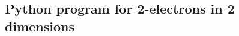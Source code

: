\documentclass[%
oneside,                 %
final,                   %
10pt]{article}
\begin{document}
\subsection*{Python program for 2-electrons in 2 dimensions}
\end{document}

